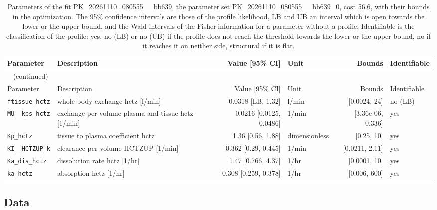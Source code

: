 \begin{longtable}{llrlrl}
\caption{Parameters of the fit PK\_20261110\_080555\_\_bb639, the parameter set PK\_20261110\_080555\_\_bb639\_0, cost 56.6, with their bounds in the optimization. The 95\% confidence intervals are those of the profile likelihood, LB and UB an interval which is open towards the lower or the upper bound, and the Wald intervals of the Fisher information for a parameter without a profile. Identifiable is the classification of the profile: yes, no (LB) or no (UB) if the profile does not reach the threshold towards the lower or the upper bound, no if it reaches it on neither side, structural if it is flat.}\label{tab:parameters:PK_20261110_080555__bb639} \\
\toprule
Parameter & Description & Value [95\% CI] & Unit & Bounds & Identifiable \\
\midrule
\endfirsthead
\multicolumn{6}{l}{\small\tablename~\thetable{} (continued)} \\
\toprule
Parameter & Description & Value [95\% CI] & Unit & Bounds & Identifiable \\
\midrule
\endhead
\bottomrule
\endlastfoot
\texttt{ftissue\_hctz} & whole-body exchange hctz [l/min] & 0.0318 [LB, 1.32] & l/min & [0.0024, 24] & no (LB) \\
\texttt{MU\_\_kps\_hctz} & exchange per volume plasma and tissue hctz [1/min] & 0.0216 [0.0125, 0.0486] & 1/min & [3.36e-06, 0.336] & yes \\
\texttt{Kp\_hctz} & tissue to plasma coefficient hctz & 1.36 [0.56, 1.88] & dimensionless & [0.25, 10] & yes \\
\texttt{KI\_\_HCTZUP\_k} & clearance per volume HCTZUP [1/min] & 0.362 [0.29, 0.445] & 1/min & [0.0211, 2.11] & yes \\
\texttt{Ka\_dis\_hctz} & dissolution rate hctz [1/hr] & 1.47 [0.766, 4.37] & 1/hr & [0.0001, 10] & yes \\
\texttt{ka\_hctz} & absorption hctz [1/hr] & 0.308 [0.259, 0.378] & 1/hr & [0.006, 600] & yes \\
\end{longtable}

\subsection{Data}

